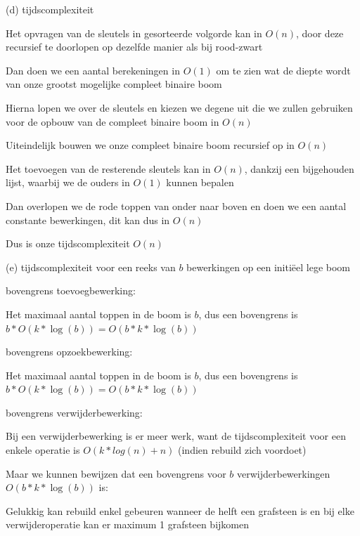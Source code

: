 \documentclass{article}
\begin{document}
\vspace{0.5cm}

\Large (d) tijdscomplexiteit
\vspace{0.3cm}

\large
Het opvragen van de sleutels in gesorteerde volgorde kan in $O(n)$, door deze recursief te doorlopen op dezelfde manier als bij rood-zwart

Dan doen we een aantal berekeningen in $O(1)$ om te zien wat de diepte wordt van onze grootst mogelijke compleet binaire boom

Hierna lopen we over de sleutels en kiezen we degene uit die we zullen gebruiken voor de opbouw van de compleet binaire boom in $O(n)$

Uiteindelijk bouwen we onze compleet binaire boom recursief op in $O(n)$

Het toevoegen van de resterende sleutels kan in $O(n)$, dankzij een bijgehouden lijst, waarbij we de ouders in $O(1)$ kunnen bepalen

Dan overlopen we de rode toppen van onder naar boven en doen we een aantal constante bewerkingen, dit kan dus in $O(n)$

Dus is onze tijdscomplexiteit $O(n)$

\newpage

\Large (e) tijdscomplexiteit voor een reeks van $b$ bewerkingen op een initiëel lege boom
\vspace{0.3cm}

\large
bovengrens toevoegbewerking:

Het maximaal aantal toppen in de boom is $b$, dus een bovengrens is $b * O(k*\log(b)) = O(b * 
 k *\log (b))$

\vspace{0.2cm}

bovengrens opzoekbewerking:

Het maximaal aantal toppen in de boom is $b$, dus een bovengrens is $b * O(k * \log(b)) = O(b * k * \log (b))$

\vspace{0.2cm}

bovengrens verwijderbewerking:

Bij een verwijderbewerking is er meer werk, want de tijdscomplexiteit voor een enkele operatie is $O(k * log(n) + n)$ (indien rebuild zich voordoet)

Maar we kunnen bewijzen dat een bovengrens voor $b$ verwijderbewerkingen $O(b * k * \log(b))$ is:

Gelukkig kan rebuild enkel gebeuren wanneer de helft een grafsteen is en bij elke verwijderoperatie kan er maximum 1 grafsteen bijkomen
\end{document}
